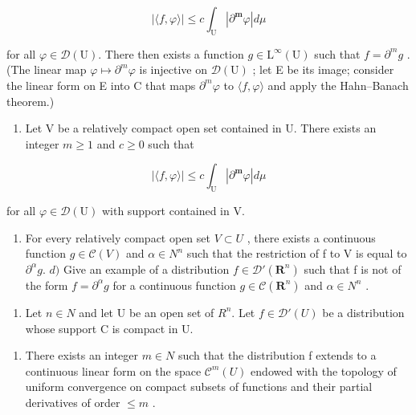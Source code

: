 \[
| \langle f, \varphi \rangle | \leqslant c \int_ {\mathrm{U}} | \partial^ {\boldsymbol {m}} \varphi | d \mu
\]

for all \(\varphi\in\mathcal{D}(\mathrm{U})\). There then exists a function \(g\in\mathrm{L}^{\infty}(\mathrm{U})\) such that \(f=\partial^{m}g\) . (The linear map \(\varphi\mapsto\partial^{m}\varphi\) is injective on \(\mathcal{D}(\mathrm{U})\) ; let E be its image; consider the linear form on E into C that maps \(\partial^{m}\varphi\) to \(\langle f,\varphi\rangle\) and apply the Hahn--Banach theorem.)

\begin{enumerate}
\def\labelenumi{\alph{enumi})}
\setcounter{enumi}{1}
\tightlist
\item
  Let V be a relatively compact open set contained in U. There exists an integer \(m \geqslant 1\) and \(c \geqslant 0\) such that
\end{enumerate}

\[
| \langle f, \varphi \rangle | \leqslant c \int_ {\mathrm{U}} | \partial^ {\boldsymbol {m}} \varphi | d \mu
\]

for all \(\varphi\in\mathcal{D}(\mathrm{U})\) with support contained in V.

\begin{enumerate}
\def\labelenumi{\alph{enumi})}
\setcounter{enumi}{2}
\tightlist
\item
  For every relatively compact open set \(V \subset U\) , there exists a continuous function \(g \in \mathcal{C}(V)\) and \(\alpha \in N^{n}\) such that the restriction of f to V is equal to \(\partial^{\alpha}g\). \(d)\) Give an example of a distribution \(f \in \mathcal{D}'(\mathbf{R}^{n})\) such that f is not of the form \(f = \partial^{\alpha}g\) for a continuous function \(g \in \mathcal{C}(\mathbf{R}^{n})\) and \(\alpha \in N^{n}\) .
\end{enumerate}

\begin{enumerate}
\def\labelenumi{\arabic{enumi})}
\setcounter{enumi}{23}
\tightlist
\item
  Let \(n \in N\) and let U be an open set of \(R^{n}\). Let \(f \in \mathcal{D}'(U)\) be a distribution whose support C is compact in U.
\end{enumerate}

\begin{enumerate}
\def\labelenumi{\alph{enumi})}
\tightlist
\item
  There exists an integer \(m \in N\) such that the distribution f extends to a continuous linear form on the space \(\mathcal{C}^{m}(U)\) endowed with the topology of uniform convergence on compact subsets of functions and their partial derivatives of order \(\leqslant m\) .
\end{enumerate}

